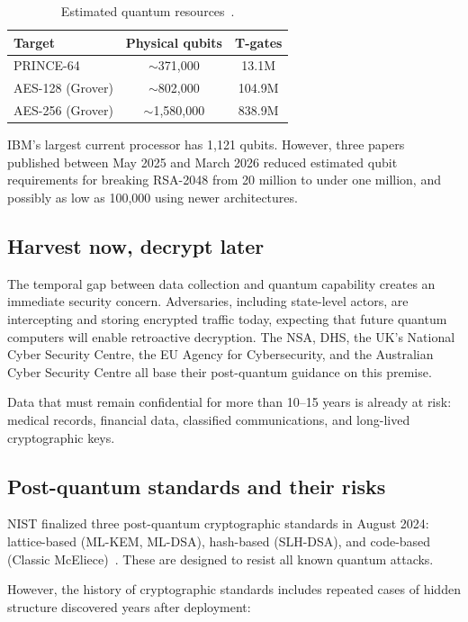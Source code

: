 \documentclass[11pt]{article}
\begin{document}
\begin{table}[h]
\centering
\small
\begin{tabular}{@{}lcc@{}}
\toprule
Target & Physical qubits & T-gates \\
\midrule
PRINCE-64 & $\sim$371,000 & 13.1M \\
AES-128 (Grover) & $\sim$802,000 & 104.9M \\
AES-256 (Grover) & $\sim$1,580,000 & 838.9M \\
\bottomrule
\end{tabular}
\caption{Estimated quantum resources~\cite{bonnetain2022,jaques2020}.}
\end{table}

IBM's largest current processor has 1,121 qubits. However, three papers published between May 2025 and March 2026 reduced estimated qubit requirements for breaking RSA-2048 from 20 million to under one million, and possibly as low as 100,000 using newer architectures.

\subsection{Harvest now, decrypt later}

The temporal gap between data collection and quantum capability creates an immediate security concern. Adversaries, including state-level actors, are intercepting and storing encrypted traffic today, expecting that future quantum computers will enable retroactive decryption. The NSA, DHS, the UK's National Cyber Security Centre, the EU Agency for Cybersecurity, and the Australian Cyber Security Centre all base their post-quantum guidance on this premise.

Data that must remain confidential for more than 10--15 years is already at risk: medical records, financial data, classified communications, and long-lived cryptographic keys.

\subsection{Post-quantum standards and their risks}

NIST finalized three post-quantum cryptographic standards in August 2024: lattice-based (ML-KEM, ML-DSA), hash-based (SLH-DSA), and code-based (Classic McEliece)~\cite{nist2024}. These are designed to resist all known quantum attacks.

However, the history of cryptographic standards includes repeated cases of hidden structure discovered years after deployment:
\end{document}
